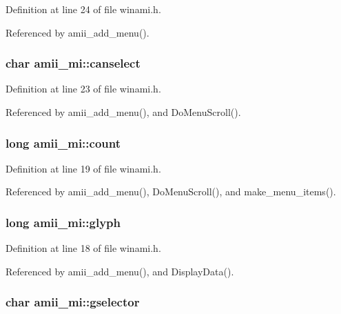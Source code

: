 Definition at line 24 of file winami.\+h.



Referenced by amii\+\_\+add\+\_\+menu().

\hypertarget{structamii__mi_a68250523fd29eae87c3a438284fab1c0}{
\subsubsection[{canselect}]{\setlength{\rightskip}{0pt plus 5cm}char amii\+\_\+mi\+::canselect}}\label{structamii__mi_a68250523fd29eae87c3a438284fab1c0}


Definition at line 23 of file winami.\+h.



Referenced by amii\+\_\+add\+\_\+menu(), and Do\+Menu\+Scroll().

\hypertarget{structamii__mi_a15c24390709412f24da5e5207808712b}{
\subsubsection[{count}]{\setlength{\rightskip}{0pt plus 5cm}long amii\+\_\+mi\+::count}}\label{structamii__mi_a15c24390709412f24da5e5207808712b}


Definition at line 19 of file winami.\+h.



Referenced by amii\+\_\+add\+\_\+menu(), Do\+Menu\+Scroll(), and make\+\_\+menu\+\_\+items().

\hypertarget{structamii__mi_a3e4c3c4ab75e4d6027c978bb75fffbce}{
\subsubsection[{glyph}]{\setlength{\rightskip}{0pt plus 5cm}long amii\+\_\+mi\+::glyph}}\label{structamii__mi_a3e4c3c4ab75e4d6027c978bb75fffbce}


Definition at line 18 of file winami.\+h.



Referenced by amii\+\_\+add\+\_\+menu(), and Display\+Data().

\hypertarget{structamii__mi_aa5480683a78e9e88d8569be6438c7ae5}{
\subsubsection[{gselector}]{\setlength{\rightskip}{0pt plus 5cm}char amii\+\_\+mi\+::gselector}}\label{structamii__mi_aa5480683a78e9e88d8569be6438c7ae5}


